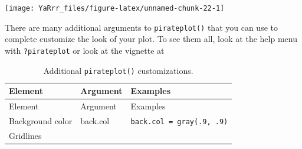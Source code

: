 \documentclass[]{book}
\theoremstyle{definition}
\theoremstyle{definition}
\theoremstyle{remark}
\begin{document}
\begin{center}\texttt{[image: YaRrr\_files/figure-latex/unnamed-chunk-22-1]} \end{center}

There are many additional arguments to \texttt{pirateplot()} that you
can use to complete customize the look of your plot. To see them all,
look at the help menu with \texttt{?pirateplot} or look at the vignette
at \href{}{}

\begin{longtable}[]{@{}lll@{}}
\caption{\label{tab:pirateplotcustomisation} Additional
\texttt{pirateplot()} customizations.}\tabularnewline
\toprule
\begin{minipage}[b]{0.19\columnwidth}\raggedright\strut
Element\strut
\end{minipage} & \begin{minipage}[b]{0.24\columnwidth}\raggedright\strut
Argument\strut
\end{minipage} & \begin{minipage}[b]{0.48\columnwidth}\raggedright\strut
Examples\strut
\end{minipage}\tabularnewline
\midrule
\endfirsthead
\toprule
\begin{minipage}[b]{0.19\columnwidth}\raggedright\strut
Element\strut
\end{minipage} & \begin{minipage}[b]{0.24\columnwidth}\raggedright\strut
Argument\strut
\end{minipage} & \begin{minipage}[b]{0.48\columnwidth}\raggedright\strut
Examples\strut
\end{minipage}\tabularnewline
\midrule
\endhead
\begin{minipage}[t]{0.19\columnwidth}\raggedright\strut
Background color\strut
\end{minipage} & \begin{minipage}[t]{0.24\columnwidth}\raggedright\strut
back.col\strut
\end{minipage} & \begin{minipage}[t]{0.48\columnwidth}\raggedright\strut
\texttt{back.col\ =\ \textquotesingle{}gray(.9,\ .9)\textquotesingle{}}\strut
\end{minipage}\tabularnewline
\begin{minipage}[t]{0.19\columnwidth}\raggedright\strut
Gridlines\strut
\end{minipage} & \begin{minipage}[t]{0.24\columnwidth}\raggedright\strut

\end{minipage}
\end{longtable}
\end{document}
